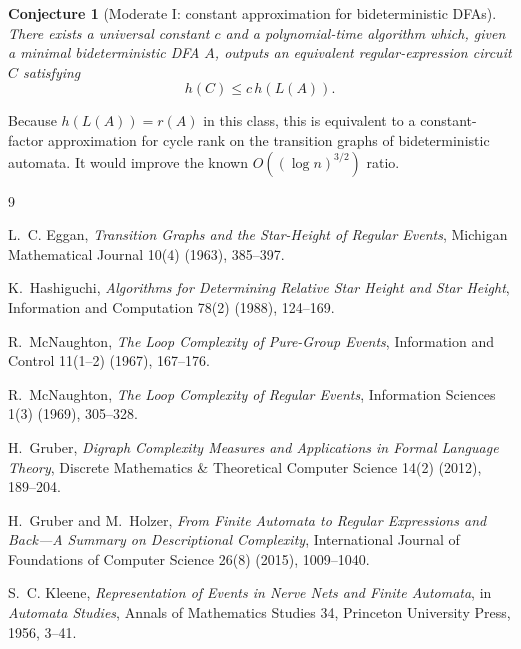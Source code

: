 \documentclass[11pt]{article}
\newtheorem{conjecture}{Conjecture}
\begin{document}
\begin{conjecture}[Moderate I: constant approximation for bideterministic DFAs]
There exists a universal constant $c$ and a polynomial-time algorithm which,
given a minimal bideterministic DFA $A$, outputs an equivalent
regular-expression circuit $C$ satisfying
\[
 h(C)\leq c\,h(L(A)).
\]
\end{conjecture}

Because $h(L(A))=r(A)$ in this class, this is equivalent to a constant-factor
approximation for cycle rank on the transition graphs of bideterministic
automata. It would improve the known $O((\log n)^{3/2})$ ratio.


\begin{thebibliography}{9}

L.~C. Eggan,
\emph{Transition Graphs and the Star-Height of Regular Events},
Michigan Mathematical Journal 10(4) (1963), 385--397.

K.~Hashiguchi,
\emph{Algorithms for Determining Relative Star Height and Star Height},
Information and Computation 78(2) (1988), 124--169.

R.~McNaughton,
\emph{The Loop Complexity of Pure-Group Events},
Information and Control 11(1--2) (1967), 167--176.

R.~McNaughton,
\emph{The Loop Complexity of Regular Events},
Information Sciences 1(3) (1969), 305--328.

H.~Gruber,
\emph{Digraph Complexity Measures and Applications in Formal Language
Theory},
Discrete Mathematics \& Theoretical Computer Science 14(2) (2012),
189--204.

H.~Gruber and M.~Holzer,
\emph{From Finite Automata to Regular Expressions and Back---A Summary on
Descriptional Complexity},
International Journal of Foundations of Computer Science 26(8) (2015),
1009--1040.

S.~C. Kleene,
\emph{Representation of Events in Nerve Nets and Finite Automata},
in \emph{Automata Studies}, Annals of Mathematics Studies 34,
Princeton University Press, 1956, 3--41.

\end{thebibliography}
\end{document}
